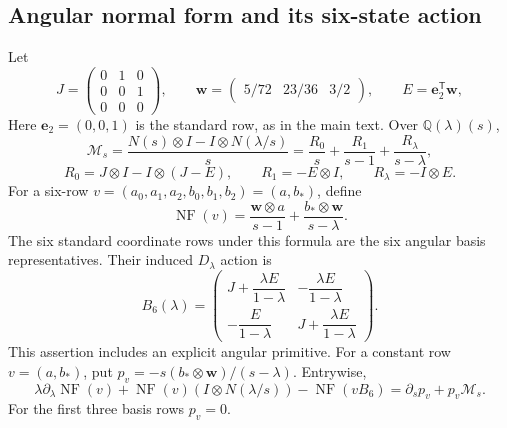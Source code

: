 \documentclass[11pt,a4paper]{article}
\newcommand{\tr}{\mathsf T}
\newcommand{\e}{\mathbf e}
\newcommand{\ww}{\mathbf w}
\begin{document}
\subsection{Angular normal form and its six-state action}

Let
\[
 J=\begin{pmatrix}0&1&0\\0&0&1\\0&0&0\end{pmatrix},\qquad
 \ww=\begin{pmatrix}5/72&23/36&3/2\end{pmatrix},\qquad E=\e_2^{\tr}\ww,
\]
Here \(\e_2=(0,0,1)\) is the standard row, as in the main text.  Over \(\mathbb Q(\lambda)(s)\),
\[
 \mathcal M_s=\frac{N(s)\otimes I-I\otimes N(\lambda/s)}s
 =\frac{R_0}s+\frac{R_1}{s-1}+\frac{R_\lambda}{s-\lambda},
\]
\[
 R_0=J\otimes I-I\otimes(J-E),\qquad
 R_1=-E\otimes I,\qquad R_\lambda=-I\otimes E.
\]
For a six-row \(v=(a_0,a_1,a_2,b_0,b_1,b_2)=(a,b_*)\), define
\begin{equation}\label{eq:appendix-NF}
 \operatorname{NF}(v)=\frac{\ww\otimes a}{s-1}
                         +\frac{b_*\otimes \ww}{s-\lambda}.
\end{equation}
The six standard coordinate rows under this formula are the six angular
basis representatives.  Their induced \(D_\lambda\) action is
\begin{equation}\label{eq:appendix-B6}
 B_6(\lambda)=\begin{pmatrix}
 J+\dfrac{\lambda E}{1-\lambda}&-\dfrac{\lambda E}{1-\lambda}\\[2pt]
 -\dfrac{E}{1-\lambda}&J+\dfrac{\lambda E}{1-\lambda}
 \end{pmatrix}.
\end{equation}
This assertion includes an explicit angular primitive.  For a constant
row \(v=(a,b_*)\), put
\(p_v=-s(b_*\otimes \ww)/(s-\lambda)\).  Entrywise,
\begin{equation}\label{eq:appendix-six-action}
 \lambda\partial_\lambda\operatorname{NF}(v)
 +\operatorname{NF}(v)(I\otimes N(\lambda/s))
 -\operatorname{NF}(vB_6)
 =\partial_sp_v+p_v\mathcal M_s.
\end{equation}
For the first three basis rows \(p_v=0\).
\end{document}
